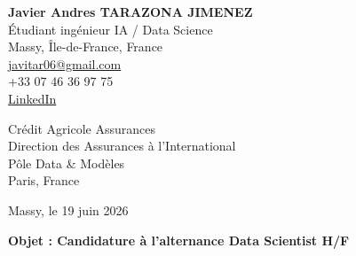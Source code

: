 \documentclass[10pt,a4paper]{article}
\begin{document}
\begin{minipage}[t]{0.48\textwidth}
\textbf{\large Javier Andres TARAZONA JIMENEZ}\\
Étudiant ingénieur IA / Data Science\\
Massy, Île-de-France, France\\
\href{mailto:javitar06@gmail.com}{javitar06@gmail.com}\\
+33 07 46 36 97 75\\
\href{https://www.linkedin.com/in/javier-andres-tarazona-jimenez-84b489222/}{LinkedIn}
\end{minipage}
\hfill
\begin{minipage}[t]{0.42\textwidth}
\raggedleft
Crédit Agricole Assurances\\
Direction des Assurances à l'International\\
Pôle Data \& Modèles\\
Paris, France
\end{minipage}

\vspace{1.1cm}

\raggedleft
Massy, le 19 juin 2026

\vspace{0.7cm}

\raggedright
\textbf{Objet : Candidature à l'alternance Data Scientist H/F}

\vspace{0.5cm}
\end{document}
